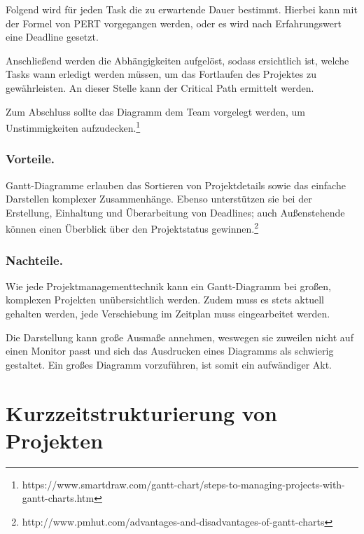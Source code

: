 			Folgend wird für jeden Task die zu erwartende Dauer bestimmt.
			Hierbei kann mit der Formel von PERT vorgegangen werden, oder es wird nach Erfahrungswert eine Deadline gesetzt.
			
			Anschließend werden die Abhängigkeiten aufgelöst, sodass ersichtlich ist, welche Tasks wann erledigt werden müssen, um das Fortlaufen des Projektes zu gewährleisten.
			An dieser Stelle kann der Critical Path ermittelt werden.
			
			Zum Abschluss sollte das Diagramm dem Team vorgelegt werden, um Unstimmigkeiten aufzudecken.\footnote{
				https://www.smartdraw.com/gantt-chart/steps-to-managing-projects-with-gantt-charts.htm
			}
		\subsubsection{Vorteile.}
			\label{sssec:gantt-pro}
			Gantt-Diagramme erlauben das Sortieren von Projektdetails sowie das einfache Darstellen komplexer Zusammenhänge.
			Ebenso unterstützen sie bei der Erstellung, Einhaltung und Überarbeitung von Deadlines; auch Außenstehende können einen Überblick über den Projektstatus gewinnen.\footnote{
				http://www.pmhut.com/advantages-and-disadvantages-of-gantt-charts
			}
		\subsubsection{Nachteile.}
			\label{sssec:gantt-con}
			Wie jede Projektmanagementtechnik kann ein Gantt-Diagramm bei großen, komplexen Projekten unübersichtlich werden.
			Zudem muss es stets aktuell gehalten werden, jede Verschiebung im Zeitplan muss eingearbeitet werden.
			
			Die Darstellung kann große Ausmaße annehmen, weswegen sie zuweilen nicht auf einen Monitor passt und sich das Ausdrucken eines Diagramms als schwierig gestaltet.
			Ein großes Diagramm vorzuführen, ist somit ein aufwändiger Akt.
	
\section{Kurzzeitstrukturierung von Projekten}
	\label{sec:short-term}
	
